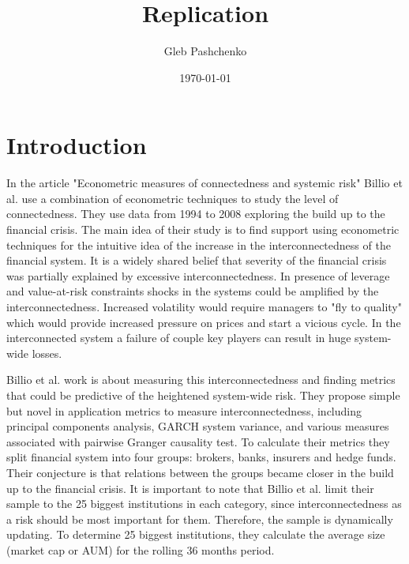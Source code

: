 \documentclass[preprint,pre,floats,aps,amsmath,amssymb]{revtex4}
\begin{document}
\title{Replication}
\author{Gleb Pashchenko}
\date{\today}



\maketitle




\section{Introduction}
\label{sec:intro}

In the article "Econometric measures of connectedness and systemic risk" Billio et al. \cite{billio} use a combination of econometric techniques to study the level of connectedness. They use data from 1994 to 2008 exploring the build up to the financial crisis. The main idea of their study is to find support using econometric techniques for the intuitive idea of the increase in the interconnectedness of the financial system. It is a widely shared belief that severity of the financial crisis was partially explained by  excessive interconnectedness. In presence of leverage and value-at-risk constraints shocks in the systems could be amplified by the interconnectedness. Increased volatility would require managers to "fly to quality" which would provide increased pressure on prices and start a vicious cycle. In the interconnected system a failure of couple key players can result in huge system-wide losses. 

Billio et al.  work is about measuring this interconnectedness and finding metrics that could be predictive of the heightened system-wide risk. They propose simple but novel in application metrics to measure interconnectedness, including principal components analysis, GARCH system variance, and various measures associated with pairwise Granger causality test. To calculate their metrics they split financial system into four groups: brokers, banks, insurers and hedge funds. Their conjecture  is that relations between the groups became closer in the build up to the financial crisis. It is important to note that Billio et al. limit their sample to the 25 biggest institutions in each category, since interconnectedness as a risk should be most important for them.  Therefore, the sample is dynamically updating. To determine 25 biggest institutions, they calculate the average size (market cap or AUM) for the rolling 36 months period. 
\end{document}
